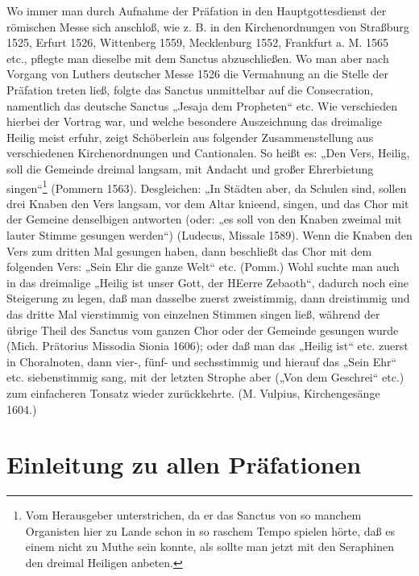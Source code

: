 Wo immer man durch Aufnahme der Präfation in den Hauptgottesdienst der römischen Messe sich anschloß, wie z. B. in den Kirchenordnungen von Straßburg 1525, Erfurt 1526, Wittenberg 1559, Mecklenburg 1552, Frankfurt a. M. 1565 etc., pflegte man dieselbe mit dem Sanctus abzuschließen. Wo man aber nach Vorgang von Luthers deutscher Messe 1526 die Vermahnung an die Stelle der Präfation treten ließ, folgte das Sanctus unmittelbar auf die Consecration, namentlich das deutsche Sanctus „Jesaja dem Propheten“ etc. Wie verschieden hierbei der Vortrag war, und welche besondere Auszeichnung das dreimalige Heilig meist erfuhr, zeigt Schöberlein aus folgender Zusammenstellung aus verschiedenen Kirchenordnungen und Cantionalen. So heißt es: „Den Vers, Heilig, soll die Gemeinde dreimal langsam, mit
Andacht und großer Ehrerbietung singen“\footnote{Vom Herausgeber unterstrichen, da er das Sanctus von so manchem Organisten hier zu Lande schon in so raschem Tempo spielen hörte, daß es einem nicht zu Muthe sein konnte, als sollte man jetzt mit den Seraphinen den dreimal Heiligen anbeten.} (Pommern 1563). Desgleichen: „In Städten aber, da Schulen sind, sollen drei Knaben den Vers langsam, vor dem Altar knieend, singen, und das Chor mit der Gemeine denselbigen antworten (oder: „es soll von den Knaben zweimal mit lauter Stimme gesungen werden“) (Ludecus, Missale 1589). Wenn die Knaben den Vers zum dritten Mal gesungen haben, dann beschließt das Chor mit dem folgenden Vers: „Sein Ehr die ganze Welt“ etc. (Pomm.) Wohl suchte man auch in das dreimalige „Heilig ist unser Gott, der HEerre Zebaoth“, dadurch noch eine Steigerung zu legen, daß man dasselbe zuerst zweistimmig, dann dreistimmig und das dritte Mal vierstimmig von einzelnen Stimmen singen ließ, während der übrige Theil des Sanctus vom ganzen Chor oder der Gemeinde gesungen wurde (Mich. Prätorius Missodia Sionia 1606); oder daß man das „Heilig ist“ etc. zuerst in Choralnoten, dann vier-, fünf- und sechsstimmig und hierauf das „Sein Ehr“ etc. siebenstimmig sang, mit der letzten Strophe aber („Von dem Geschrei“ etc.) zum einfacheren Tonsatz wieder zurückkehrte. (M. Vulpius, Kirchengesänge 1604.)

\section{Einleitung zu allen Präfationen}


